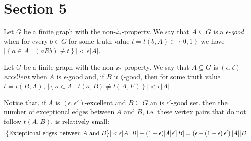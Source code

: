 \section{Section 5} \label{sec:section_5}

        Let $G$ be a finite graph with the non-$k_*$-property.
        We say that $A \subseteq G$ is a $\epsilon$-\emph{good} when for every $b \in G$ for some truth value
        $t = t(b, A) \in \left\{ 0, 1 \right\}$ we have $|\left\{ a\in A \mid (aRb) \not\equiv t \right\}| < \epsilon |A|$.

        Let $G$ be a finite graph with the non-$k_*$-property.
        We say that $A \subseteq G$ is $(\epsilon, \zeta)$-\emph{excellent} when $A$ is $\epsilon$-good and, if $B$ is
        $\zeta$-good, then for some truth value $t = t(B,A)$, $|\left\{ a \in A \mid t(a,B) \neq t(A,B) \right\}| < \epsilon |A|$.

    \remark\label{remark_excellence_imply_little_exceptions}
        Notice that, if $A$ is $(\epsilon, \epsilon')$-excellent and $B \subseteq G$ an is $\epsilon'$-good set, then
        the number of exceptional edges between $A$ and $B$, i.e. these vertex pairs that do not follow $t(A,B)$, is
        relatively small:
        $$
            \left| \left\{ \text{Exceptional edges between } A \text{ and } B \right\} \right| <
                \epsilon |A| |B| + (1- \epsilon) |A| \epsilon' |B| = \left( \epsilon + \left( 1-\epsilon \right) \epsilon' \right) |A| |B|
        $$

